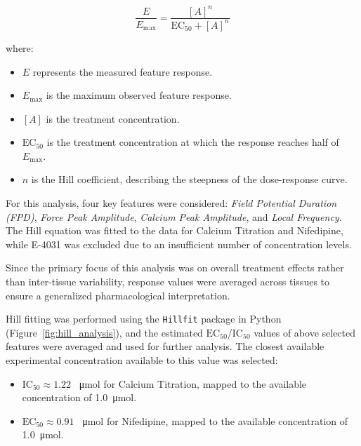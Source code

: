 \documentclass{report}
\begin{document}
        \begin{equation}
            \frac{E}{E_{\max}} = \frac{[A]^n}{\text{EC}_{50} + [A]^n}
        \end{equation}
        
        where:
        \begin{itemize}
            \item \(E\) represents the measured feature response.
            \item \(E_{\max}\) is the maximum observed feature response.
            \item \([A]\) is the treatment concentration.
            \item \(\text{EC}_{50}\) is the treatment concentration at which the response reaches half of \(E_{\max}\).
            \item \(n\) is the Hill coefficient, describing the steepness of the dose-response curve.
        \end{itemize}
        
        For this analysis, four key features were considered: \textit{Field Potential Duration (FPD)}, \textit{Force Peak Amplitude}, \textit{Calcium Peak Amplitude}, and \textit{Local Frequency}. The Hill equation was fitted to the data for Calcium Titration and Nifedipine, while E-4031 was excluded due to an insufficient number of concentration levels.
        
        Since the primary focus of this analysis was on overall treatment effects rather than inter-tissue variability, response values were averaged across tissues to ensure a generalized pharmacological interpretation.
        
        Hill fitting was performed using the \texttt{Hillfit} package \cite{himoto_hillfit} in Python (Figure~\ref{fig:hill_analysis}), and the estimated \(\text{EC}_{50}\)/\(\text{IC}_{50}\) values of above selected features were averaged and used for further analysis. The closest available experimental concentration available to this value was selected:
        \begin{itemize}
            \item \(\text{IC}_{50} \approx 1.22\) \SI{}{\umol} for Calcium Titration, mapped to the available concentration of \SI{1.0}{\umol}.
            \item \(\text{EC}_{50} \approx 0.91\) \SI{}{\umol} for Nifedipine, mapped to the available concentration of  \SI{1.0}{\umol}.
        \end{itemize}
        
\end{document}
